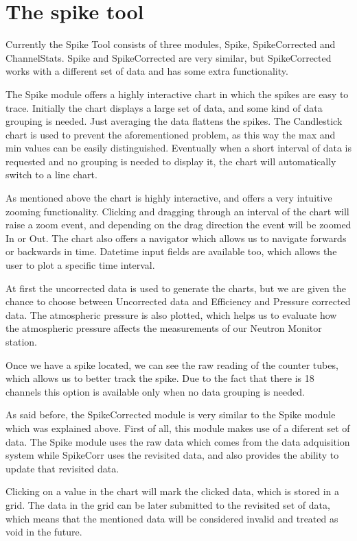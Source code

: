 \documentclass[a4paper]{jpconf}
\begin{document}
\section{The spike tool}

Currently the Spike Tool consists of three modules, Spike, SpikeCorrected and
ChannelStats. Spike and SpikeCorrected are very similar, but SpikeCorrected works
with a different set of data and has some extra functionality.

The Spike module offers a highly interactive chart in which the spikes are easy
to trace. Initially the chart displays a large set of data, and some kind of
data grouping is needed. Just averaging the data flattens the spikes.
The Candlestick chart is used to prevent the aforementioned problem, as this way the
max and min values can be easily distinguished. Eventually when a short interval
of data is requested and no grouping is needed to display it, the chart
will automatically switch to a line chart.

As mentioned above the chart is highly interactive, and offers a very intuitive
zooming functionality. Clicking and dragging through an interval of the chart will
raise a zoom event, and depending on the drag direction the event will be zoomed In
or Out. The chart also offers a navigator which allows us to navigate forwards or
backwards in time. Datetime input fields are available too, which allows the user to
plot a specific time interval.

At first the uncorrected data is used to generate the charts, but we are given
the chance to choose between Uncorrected data and Efficiency and Pressure corrected
data. The atmospheric pressure is also plotted, which helps us to evaluate how the
atmospheric pressure affects the measurements of our Neutron Monitor station.

Once we have a spike located, we can see the raw reading of the counter tubes,
which allows us to better track the spike. Due to the fact that there is 18
channels this option is available only when no data grouping is needed.

As said before, the SpikeCorrected module is very similar to the Spike module
which was explained above. First of all, this module makes use of a diferent
set of data. The Spike module uses the raw data which comes from the data
adquisition system while SpikeCorr uses the revisited data, and also provides
the ability to update that revisited data.

Clicking on a value in the chart will mark the clicked data, which is
stored in a grid. The data in the grid can be later submitted to the revisited
set of data, which means that the mentioned data will be considered invalid and
treated as void in the future.
\end{document}
